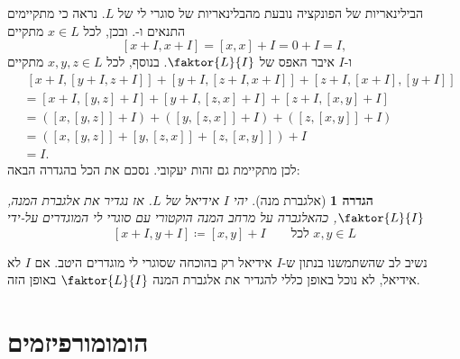 \documentclass{report}
\makeatletter
\theoremstyle{break}
\newtheorem{definition}[definition]{הגדרה}
\theoremstyle{MyNonumberbreak}
\DeclareRobustCommand{\Eqref}[1]{\textup{\tagform@{\ref*{#1}}}}
\makeatother
\begin{document}
הבילינאריות של הפונקציה נובעת מהבלינאריות של סוגרי לי של $L$. נראה כי מתקיימים התנאים \Eqref{eq:L1} ו-\Eqref{eq:Jacobi}. ובכן, לכל $x \in L$ מתקיים
\[ [x + I, x + I] = [x, x] + I = 0 + I = I, \]
ו-$I$ איבר האפס של $\faktor{L}{I}$. בנוסף, לכל $x, y, z \in L$ מתקיים
\begin{align*}
	&\; [x + I, [y + I, z + I]] + [y + I, [z + I, x + I]] + [z + I, [x + I], [y + I]] \\
		&= [x + I, [y, z] + I] + [y + I, [z, x] + I] + [z + I, [x, y] + I] \\
		&= ([x, [y, z]] + I) + ([y, [z, x]] + I) + ([z, [x, y]] + I) \\
		&= ([x, [y, z]] + [y, [z, x]] + [z, [x, y]]) + I \\
		&= I.
\end{align*}
לכן מתקיימת גם זהות יעקובי. נסכם את הכל בהגדרה הבאה:
\begin{definition}[אלגברת מנה]
	יהי $I$ אידיאל של $L$. אז נגדיר את \textit{אלגברת המנה}, $\faktor{L}{I}$, כהאלגברה על מרחב המנה הוקטורי עם סוגרי לי המוגדרים על-ידי
	\[ [x + I, y + I] \coloneqq [x, y] + I \qquad \text{לכל $x, y \in L$} \]
\end{definition}

נשיב לב שהשתמשנו בנתון ש-$I$ אידיאל רק בהוכחה שסוגרי לי מוגדרים היטב. אם $I$ לא אידיאל, לא נוכל באופן כללי להגדיר את אלגברת המנה $\faktor{L}{I}$ באופן הזה.


\chapter{הומומורפיזמים}
\end{document}
